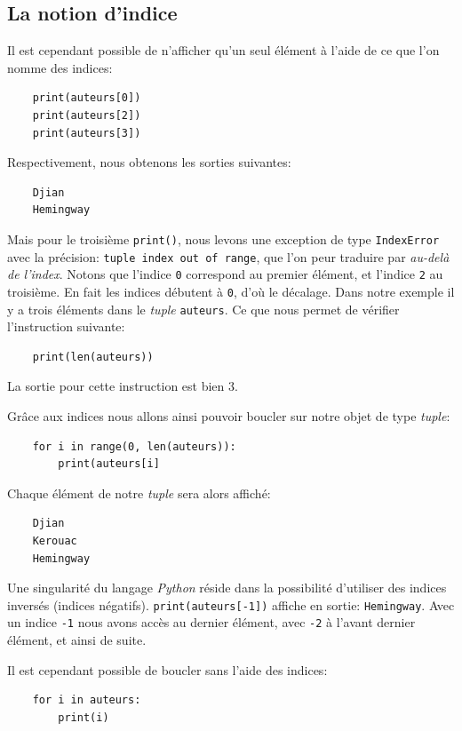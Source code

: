 \documentclass[a4paper,12pt]{book}
\begin{document}
\subsection*{La notion d'indice}
Il est cependant possible de n'afficher qu'un seul élément à l'aide de ce que l'on nomme des indices:
\begin{verbatim}
    print(auteurs[0])
    print(auteurs[2])
    print(auteurs[3])
\end{verbatim}
\medskip

Respectivement, nous obtenons les sorties suivantes:
\begin{verbatim}
    Djian
    Hemingway
\end{verbatim}
\medskip

Mais pour le troisième \texttt{print()}, nous levons une exception de type \texttt{IndexError} avec la précision: \texttt{tuple index out of range}, que l'on peur traduire par \textit{au-delà de l'index}. Notons que l'indice \texttt{0} correspond au premier élément, et l'indice \texttt{2} au troisième. En fait les indices débutent à \texttt{0}, d'où le décalage. Dans notre exemple il y a trois éléments dans le \textit{tuple} \texttt{auteurs}. Ce que nous permet de vérifier l'instruction suivante:
\begin{verbatim}
    print(len(auteurs))
\end{verbatim}
\medskip

La sortie pour cette instruction est bien 3.
\medskip

Grâce aux indices nous allons ainsi pouvoir boucler sur notre objet de type \textit{tuple}:
\begin{verbatim}
    for i in range(0, len(auteurs)):
        print(auteurs[i]
\end{verbatim}
\medskip

Chaque élément de notre \textit{tuple} sera alors affiché:
\begin{verbatim}
    Djian
    Kerouac
    Hemingway
\end{verbatim}
\medskip

Une singularité du langage \textit{Python} réside dans la possibilité d'utiliser des indices inversés (indices négatifs). \texttt{print(auteurs[-1])} affiche en sortie: \texttt{Hemingway}. Avec un indice \texttt{-1} nous avons accès au dernier élément, avec \texttt{-2} à l'avant dernier élément, et ainsi de suite.
\medskip

Il est cependant possible de boucler sans l'aide des indices:
\begin{verbatim}
    for i in auteurs:
        print(i)
\end{verbatim}
\medskip
\end{document}
